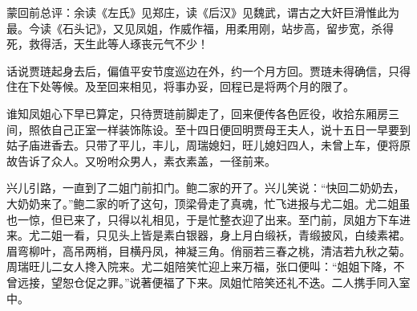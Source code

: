 

\begin{parag}
    \begin{note}蒙回前总评：余读《左氏》见郑庄，读《后汉》见魏武，谓古之大奸巨滑惟此为最。今读《石头记》，又见凤姐，作威作福，用柔用刚，站步高，留步宽，杀得死，救得活，天生此等人琢丧元气不少！\end{note}
\end{parag}


\begin{parag}
    话说贾琏起身去后，偏值平安节度巡边在外，约一个月方回。贾琏未得确信，只得住在下处等候。及至回来相见，将事办妥，回程已是将两个月的限了。
\end{parag}


\begin{parag}
    谁知凤姐心下早已算定，只待贾琏前脚走了，回来便传各色匠役，收拾东厢房三间，照依自己正室一样装饰陈设。至十四日便回明贾母王夫人，说十五日一早要到姑子庙进香去。只带了平儿，丰儿，周瑞媳妇，旺儿媳妇四人，未曾上车，便将原故告诉了众人。又吩咐众男人，素衣素盖，一径前来。
\end{parag}


\begin{parag}
    兴儿引路，一直到了二姐门前扣门。鲍二家的开了。兴儿笑说：“快回二奶奶去，大奶奶来了。”鲍二家的听了这句，顶梁骨走了真魂，忙飞进报与尤二姐。尤二姐虽也一惊，但已来了，只得以礼相见，于是忙整衣迎了出来。至门前，凤姐方下车进来。尤二姐一看，只见头上皆是素白银器，身上月白缎袄，青缎披风，白绫素裙。眉弯柳叶，高吊两梢，目横丹凤，神凝三角。俏丽若三春之桃，清洁若九秋之菊。周瑞旺儿二女人搀入院来。尤二姐陪笑忙迎上来万福，张口便叫：“姐姐下降，不曾远接，望恕仓促之罪。”说著便福了下来。凤姐忙陪笑还礼不迭。二人携手同入室中。
\end{parag}


